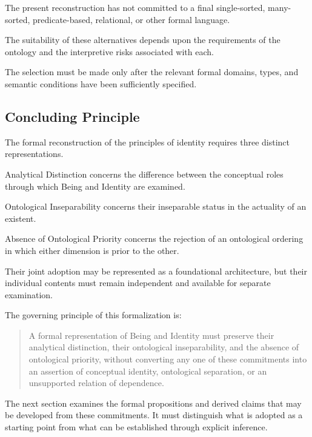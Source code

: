 The present reconstruction has
not committed to a final single-sorted,
many-sorted, predicate-based,
relational, or other formal language.

The suitability of these alternatives
depends upon the requirements of
the ontology and the interpretive
risks associated with each.

The selection must be made only
after the relevant formal domains,
types, and semantic conditions
have been sufficiently specified.

\subsection{Concluding Principle}

The formal reconstruction of the
principles of identity requires
three distinct representations.

Analytical Distinction concerns
the difference between the
conceptual roles through which
Being and Identity are examined.

Ontological Inseparability concerns
their inseparable status in the
actuality of an existent.

Absence of Ontological Priority
concerns the rejection of an
ontological ordering in which
either dimension is prior to
the other.

Their joint adoption may be
represented as a foundational
architecture, but their
individual contents must remain
independent and available for
separate examination.

The governing principle of
this formalization is:

\begin{quote}
A formal representation of
Being and Identity must preserve
their analytical distinction,
their ontological inseparability,
and the absence of ontological
priority, without converting
any one of these commitments
into an assertion of conceptual
identity, ontological separation,
or an unsupported relation
of dependence.
\end{quote}

The next section examines the
formal propositions and derived
claims that may be developed
from these commitments. It
must distinguish what is
adopted as a starting point
from what can be established
through explicit inference.

